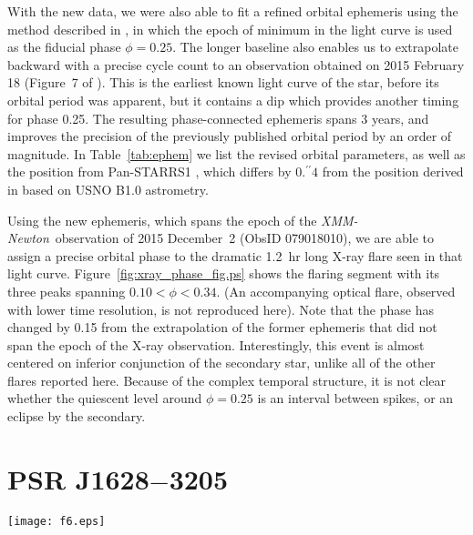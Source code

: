 \documentclass[iop]{emulateapj}
\newcommand{\xmm}{{\it XMM-Newton}}
\newcommand{\mspone}{PSR J1628$-$3205}
\begin{document}
With the new data, we were also able to fit a refined orbital
ephemeris using the method described in \citet{hal17b},
in which the epoch of minimum in the light curve
is used as the fiducial phase $\phi=0.25$.  The longer
baseline also enables us to extrapolate backward with a
precise cycle count to an observation obtained on
2015 February 18 (Figure~7 of \citealt{hal17a}).
This is the earliest known light curve of the star,
before its orbital period was apparent, but it contains
a dip which provides another timing for phase 0.25.
The resulting phase-connected ephemeris spans 3 years,
and improves the precision of the previously published orbital
period by an order of magnitude.
In Table~\ref{tab:ephem} we list the revised orbital parameters,
as well as the position from Pan-STARRS1 \citep{fle16}, which differs by
$0.\!^{\prime\prime}4$ from the position derived in \citet{hal17b}
based on USNO B1.0 astrometry.  

Using the new ephemeris, which spans the epoch of the
\xmm\ observation of 2015 December~2 (ObsID 079018010),
we are able to assign a precise orbital phase to the dramatic
1.2~hr long X-ray flare \citep{hal17b} seen in that light curve.
Figure~\ref{fig:xray_phase_fig.ps} shows
the flaring segment with its three peaks spanning $0.10<\phi<0.34$.
(An accompanying optical flare, observed with lower time resolution,
is not reproduced here).  Note that the phase has changed by 0.15
from the extrapolation of the former ephemeris that did not span
the epoch of the X-ray observation.
Interestingly, this event is almost centered
on inferior conjunction of the secondary star, unlike all of the
other flares reported here.  Because of the complex temporal structure,
it is not clear whether the quiescent level around $\phi=0.25$ is an
interval between spikes, or an eclipse by the secondary.

\section{\mspone}

\begin{figure*}
\texttt{[image: f6.eps]}
\vspace{-0.1in}
\caption{$R$-band light curves of \mspone. 
 (a) three consecutive nights
 in 2014 May superposed, adapted from \citet{li14}.
 The curve is an ellipsoidal model from that paper,
 with inclination angle $i=75^{\circ}$.
 (b) a new $R$-band light curve obtained on 2017 May 28,
 with the same model curve displaced by 0.06~mag.
 (c) the latest $R$-band light curve,
 obtained on 2018 May 20, is very similar to the one from 2017.
 (d) comparison of 2014 and 2017 data. 
}
\label{fig:mspone_phase}
\end{figure*}
\end{document}
